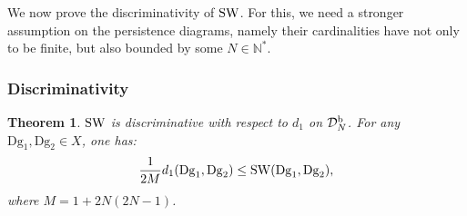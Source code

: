 \documentclass[11pt]{article}
\newcommand{\Dg}{\mathrm{Dg}}
\newcommand{\SW}{{\rm SW}}
\newcommand{\SpND}{{\mathcal D}_N^{\rm b}}
\newtheorem{thm}{Theorem}[section]
\begin{document}
We now prove the discriminativity of $\SW$.
For this, we need a stronger assumption on the persistence diagrams, namely their cardinalities have not only to be finite, but also bounded
by some $N\in\mathbb{N}^*$.










\subsubsection{Discriminativity}

\begin{thm}\label{th:discr}
$\SW$  is {\em discriminative} with respect to $d_1$ on $\SpND$.
For any $\Dg_1,\Dg_2\in X$, one has: $$\frac{1}{2M}d_1(\Dg_1,\Dg_2)\leq \SW(\Dg_1,\Dg_2),$$
where $M=1+2N(2N-1)$. 
\end{thm}
\end{document}
